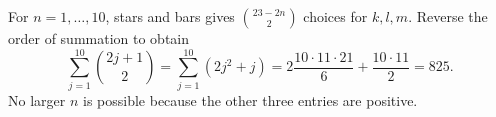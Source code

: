 For $ n=1,\ldots,10 $, stars and bars gives $\binom{23-2n}{2}$ choices for $ k,l,m $. Reverse the order of summation to obtain \[\sum_{j=1}^{10}\binom{2j+1}{2}=\sum_{j=1}^{10}(2j^2+j)=2\dfrac{10\cdot11\cdot21}{6}+\dfrac{10\cdot11}{2}=\boxed{825}.\]No larger $ n $ is possible because the other three entries are positive.
